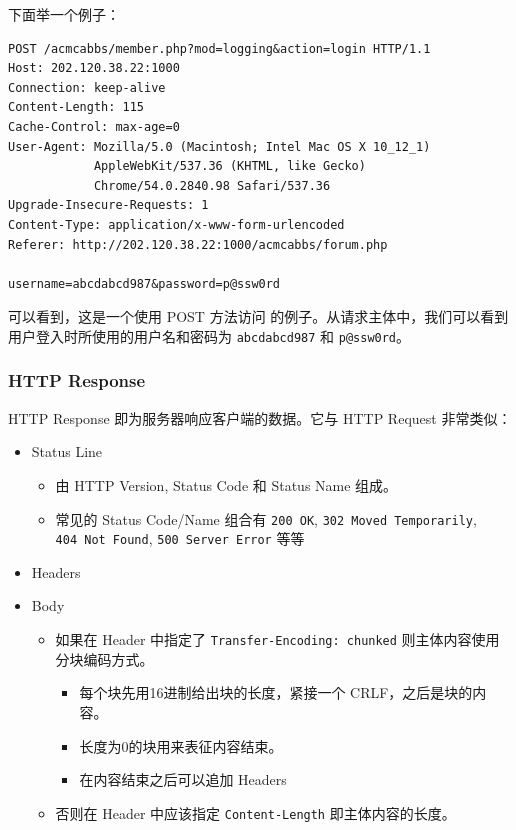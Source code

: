\documentclass[a4paper]{article}
\providecommand{\tightlist}{\setlength{\itemsep}{0pt}\setlength{\parskip}{0pt}}
\begin{document}
下面举一个例子：

\begin{verbatim}
POST /acmcabbs/member.php?mod=logging&action=login HTTP/1.1
Host: 202.120.38.22:1000
Connection: keep-alive
Content-Length: 115
Cache-Control: max-age=0
User-Agent: Mozilla/5.0 (Macintosh; Intel Mac OS X 10_12_1)
            AppleWebKit/537.36 (KHTML, like Gecko)
            Chrome/54.0.2840.98 Safari/537.36
Upgrade-Insecure-Requests: 1
Content-Type: application/x-www-form-urlencoded
Referer: http://202.120.38.22:1000/acmcabbs/forum.php

username=abcdabcd987&password=p@ssw0rd
\end{verbatim}

可以看到，这是一个使用 POST 方法访问  的例子。从请求主体中，我们可以看到用户登入时所使用的用户名和密码为 \texttt{abcdabcd987} 和 \texttt{p@ssw0rd}。

\subsubsection{HTTP Response}

HTTP Response 即为服务器响应客户端的数据。它与 HTTP Request 非常类似：

\begin{itemize}
\tightlist
\item
  Status Line

  \begin{itemize}
  \tightlist
  \item
    由 HTTP Version, Status Code 和 Status Name 组成。
  \item
    常见的 Status Code/Name 组合有 \texttt{200\ OK}, \texttt{302\ Moved\ Temporarily}, \texttt{404\ Not\ Found}, \texttt{500\ Server\ Error} 等等
  \end{itemize}
\item
  Headers
\item
  Body

  \begin{itemize}
  \tightlist
  \item
    如果在 Header 中指定了 \texttt{Transfer-Encoding:\ chunked} 则主体内容使用分块编码方式。

    \begin{itemize}
    \tightlist
    \item
      每个块先用16进制给出块的长度，紧接一个 CRLF，之后是块的内容。
    \item
      长度为0的块用来表征内容结束。
    \item
      在内容结束之后可以追加 Headers
    \end{itemize}
  \item
    否则在 Header 中应该指定 \texttt{Content-Length} 即主体内容的长度。
  \end{itemize}
\end{itemize}
\end{document}
